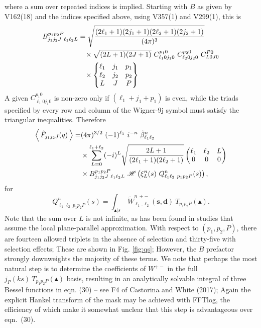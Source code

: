 \documentclass[useAMS,usenatbib]{mn2e}
\newcommand{\avg}[1]{\ensuremath{\left\langle \,#1\, \right\rangle}}
\newcommand{\tj}[6]{ \begin{pmatrix}
   #1 & #2 & #3 \\
   #4 & #5 & #6 
  \end{pmatrix}}
\newcommand{\nj}[9]{ \begin{Bmatrix}
   #1 & #2 & #3 \\
   #4 & #5 & #6 \\ 
   #7 & #8 & #9
  \end{Bmatrix}}
\begin{document}
where a sum over repeated indices is implied.  Starting with $B$ as given by V162(18) and the indices specified above, using V357(1) and V299(1), this is 
\begin{align}
&B^{p_1 p_2 P}_{j_1 j_2 J \ \ell_1 \ell_2 L}
= \sqrt{\frac{ (2 \ell_1 + 1) (2 j_1 + 1) (2 \ell_2 + 1)(2 j_2 + 1)}{(4 \pi)^3}} \notag \\
& \qquad \qquad \qquad \times \sqrt{(2 L + 1)(2 J + 1)} 
\ C^{p_1 0}_{\ell_1 0 j_1 0} 
\ C^{p_2 0}_{\ell_2 0 j_2 0}
\ C^{P   0}_{L      0 J   0} \notag \\
& \qquad \qquad \qquad \times 
\nj{\ell_1}{j_1}{p_1}{\ell_2}{j_2}{p_2}{L}{J}{P} \notag \\
\end{align}
A given $C^{p_1 0}_{\ell_1 0 j_1 0}$ is non-zero only if $(\ell_1 + j_1 + p_1)$ is even, while the triads specified by every row and column of the Wigner-9j symbol must satisfy the triangular inequalities.  Therefore 
\begin{align}
\avg{\hat{F}_{j_1 j_2 J}(q)} =& (4 \pi)^{3/2} \ (-1)^{\ell_1} \ i^{-n} \ \tilde \beta^n_{\ell_1 \ell_2} \notag \\ 
&\times \sum_{L=0}^{\ell_1 + \ell_2} (-i)^L \sqrt{\frac{2L+1}{(2\ell_1 +1)(2 \ell_2 +1)}} \tj{\ell_1}{\ell_2}{L}{0}{0}{0} \notag \\ \ & \times B^{p_1 p_2 P}_{j_1 j_2 J \ \ell_1 \ell_2 L} \ \mathcal{H} \left( \xi^{n}_{L}(s) \ Q^{n}_{\ell_1 \ell_2 \ p_1 p_2 P}(s) \right ) ,
\end{align}
for 
\begin{equation}
Q^{n}_{\ell_1 \ell_2 \ p_1 p_2 P}(s) = \int_{\blacktriangle | s} \ \tilde W^{n \ +-}_{\ell_1, \ell_2}(\boldsymbol s, \boldsymbol d) \ T_{p_1 p_2 P}(\blacktriangle).
\end{equation}
Note that the sum over $L$ is not infinite, as has been found in studies that assume the local plane-parallel approximation.  With respect to $(p_1, p_2, P)$, there are fourteen allowed triplets in the absence of selection and thirty-five with selection effects;  These are shown in Fig. \ref{fig:qs};  However, the $B$ prefactor strongly downweights the majority of these terms.  We note that perhaps the most natural step is to determine the coefficients of $W^{+-}$ in the full $j_P(ks) \ T_{p_1 p_2 P}(\blacktriangle)$ basis, resulting in an analytically solvable integral of three Bessel functions in eqn. (30) --  see F4 of Castorina and White (2017);  Again the explicit Hankel transform of the mask may be achieved with FFTlog, the efficiency of which make it somewhat unclear that this step is advantageous over eqn.~(30).         
\end{document}

